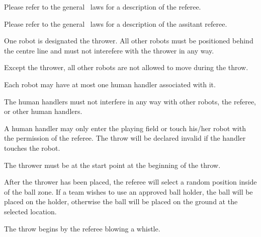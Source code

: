 \documentclass[12pt]{hurocup}
\begin{document}

Please refer to the general \HuroCup\ laws for a description of
the referee.


Please refer to the general \HuroCup\ laws for a description of
the assitant referee.


\begin{lawlist}[BB]

 \item One robot is designated the thrower. All other robots must be
 positioned behind the centre line and must not interefere with the
 thrower in any way.

 \item Except the thrower, all other robots are not allowed to move
 during the throw.

 \item Each robot may have at most one human handler associated with
 it.

 \item \label{bb-handler1} The human handlers must not interfere in
 any way with other robots, the referee, or other human handlers.

 \item \label{bb-handler2} A human handler may only enter the playing
 field or touch his/her robot with the permission of the referee. The
 throw will be declared invalid if the handler touches the robot.

 \item The thrower must be at the start point at the beginning of the
 throw. 

 \item After the thrower has been placed, the referee will select a
   random position inside of the ball zone. If a team wishes to use an
   approved ball holder, the ball will be placed on the holder,
   otherwise the ball will be placed on the ground at the selected
   location.

 \item The throw begins by the referee blowing a whistle.


\end{lawlist}
\end{document}

